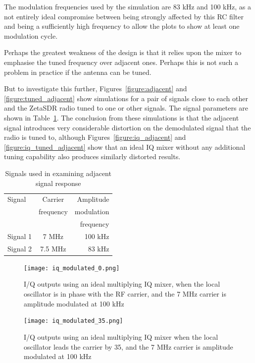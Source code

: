 \documentclass[11pt, twoside]{article}
\begin{document}
The modulation frequencies used by the simulation are 83 kHz and 100
kHz, as a not entirely ideal compromise between being strongly
affected by this RC filter and being a sufficiently high frequency to
allow the plots to show at least one modulation cycle.

Perhaps the greatest weakness of the design is that it relies upon the
mixer to emphasise the tuned frequency over adjacent ones.  Perhaps
this is not such a problem in practice if the antenna can be tuned.

But to investigate this further, Figures~\ref{figure:adjacent} and
\ref{figure:tuned_adjacent} show simulations for a pair of signals
close to each other and the ZetaSDR radio tuned to one or other
signals.  The signal parameters are shown in
Table~\ref{table:adjacent}.  The conclusion from these simulations is
that the adjacent signal introduces very considerable distortion on
the demodulated signal that the radio is tuned to, although
Figures~\ref{figure:iq_adjacent} and \ref{figure:iq_tuned_adjacent}
show that an ideal IQ mixer without any additional tuning capability
also produces similarly distorted results.

\begin{table}[ht]
  \center
  \begin{tabular}{| l| c| r |}
    \hline
    Signal & Carrier & Amplitude \\
    & frequency & modulation \\
    && frequency \\
    \hline
    \hline
    Signal 1 & 7 MHz & 100 kHz \\
    Signal 2 & 7.5 MHz & 83 kHz\\
    \hline
  \end{tabular}
  \caption{Signals used in examining adjacent signal response}
  \label{table:adjacent}
\end{table}

\begin{figure}
  \center \captionsetup{width=.8\linewidth}
  \texttt{[image: iq\_modulated\_0.png]}
  \caption{I/Q outputs using an ideal multiplying IQ mixer, when the
    local oscillator is in phase with the RF carrier, and the 7 MHz
    carrier is amplitude modulated at 100 kHz}
  \label{figure:iq_mod}
\end{figure}

\begin{figure}
  \center
    \captionsetup{width=.8\linewidth}
  \texttt{[image: iq\_modulated\_35.png]}
  \caption{I/Q outputs using an ideal multiplying IQ mixer when the
    local oscillator leads the carrier by 35{\degree}, and the 7 MHz
    carrier is amplitude modulated at 100 kHz}
  \label{figure:iq_modphase}
\end{figure}
\end{document}

